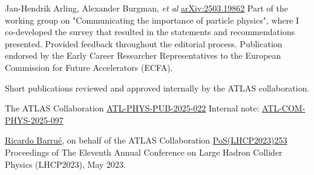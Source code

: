 
\begin{cventries}
    {Jan-Hendrik Arling, Alexander Burgman, \textit{et al}}{}
    {\href{https://arxiv.org/pdf/2503.19862}{arXiv:2503.19862}}
    {
        Part of the working group on "Communicating the importance of particle physics", where I co-developed the survey that resulted in the statements and recommendations presented. Provided feedback throughout the editorial process. Publication endorsed by the Early Career Researcher Representatives to the European Commission for Future Accelerators (ECFA).
    }    
\end{cventries}


Short publications reviewed and approved internally by the ATLAS collaboration.

\begin{cventries}
    {The ATLAS Collaboration}{}
    {\href{https://atlas.web.cern.ch/Atlas/GROUPS/PHYSICS/PUBNOTES/ATL-PHYS-PUB-2025-022/}{ATL-PHYS-PUB-2025-022}}
    {
        Internal note: \href{https://cds.cern.ch/record/2925370}{ATL-COM-PHYS-2025-097}
    }
\end{cventries}


\begin{cventries}
    {\underline{Ricardo Barrué}, on behalf of the ATLAS Collaboration}{}
    {\href{https://pos.sissa.it/450/253/}{PoS(LHCP2023)253}}
    {
        Proceedings of The Eleventh Annual Conference on Large Hadron Collider Physics (LHCP2023), May 2023.
    }
\end{cventries}


